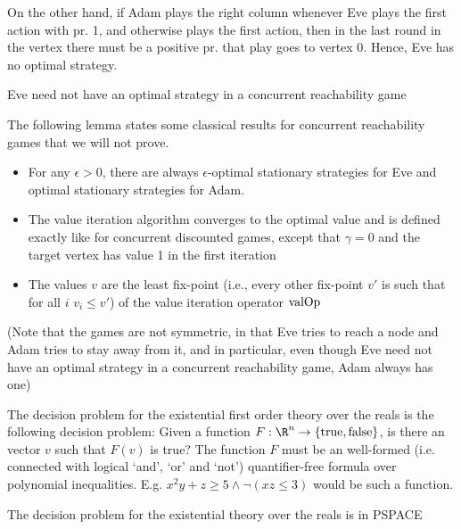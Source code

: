 On the other hand, if Adam plays the right column whenever Eve plays the first action with pr. 1, and otherwise plays the first action, 
then in the last round in the vertex there must be a positive pr. that play goes to vertex 0. Hence, Eve has no optimal strategy.


\begin{lemma}\label{lemm:no_opt_reach}
Eve need not have an optimal strategy in a concurrent reachability game
\end{lemma}

The following lemma states some classical results for concurrent reachability games that we will not prove.
\begin{lemma}\label{lemm:reach_class}
\begin{itemize}
\item For any $\epsilon>0$, there are always $\epsilon$-optimal stationary strategies for Eve and optimal stationary strategies for Adam. 
\item The value iteration algorithm converges to the optimal value and is defined exactly like for concurrent discounted games, except that $\gamma=0$ and the target vertex has value 1 in the first iteration
\item The values $v$ are the least fix-point (i.e., every other fix-point $v'$ is such that for all $i$ $v_i\leq v'$) of the value iteration operator $\text{valOp}$

\end{itemize}
\end{lemma}
(Note that the games are not symmetric, in that Eve tries to reach a node and Adam tries to stay away from it, and in particular, even though Eve need not have an optimal strategy in a concurrent reachability game, Adam always has one)






The decision problem for the existential first order theory over the reals is the following decision problem:
Given a function $F:\R^n\rightarrow \{\text{true},\text{false}\}$, is there an vector $v$ such that $F(v)$ is true?
The function $F$ must be an well-formed (i.e. connected with logical `and', `or' and `not') quantifier-free formula over polynomial inequalities.
E.g. $x^2y+z\geq 5\wedge \neg (xz\leq 3)$ would be such a function.

\begin{lemma}
The decision problem for the existential theory over the reals is in PSPACE
\end{lemma} 

